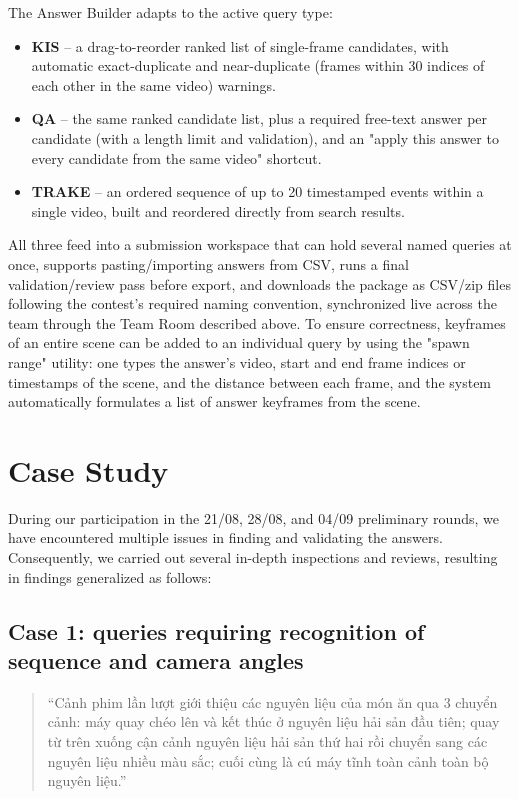 \documentclass[11pt,a4paper]{article}
\begin{document}
The Answer Builder adapts to the active query type:
\begin{itemize}[leftmargin=1.5em]
    \item \textbf{KIS} -- a drag-to-reorder ranked list of single-frame candidates, with automatic exact-duplicate and near-duplicate (frames within 30 indices of each other in the same video) warnings.
    \item \textbf{QA} -- the same ranked candidate list, plus a required free-text answer per candidate (with a length limit and validation), and an "apply this answer to every candidate from the same video" shortcut.
    \item \textbf{TRAKE} -- an ordered sequence of up to 20 timestamped events within a single video, built and reordered directly from search results.
\end{itemize}
All three feed into a submission workspace that can hold several named queries at once, supports pasting/importing answers from CSV, runs a final validation/review pass before export, and downloads the package as CSV/zip files following the contest's required naming convention, synchronized live across the team through the Team Room described above. To ensure correctness, keyframes of an entire scene can be added to an individual query by using the "spawn range" utility: one types the answer's video, start and end frame indices or timestamps of the scene, and the distance between each frame, and the system automatically formulates a list of answer keyframes from the scene.

\section{Case Study}

During our participation in the 21/08, 28/08, and 04/09 preliminary rounds, we have encountered multiple issues in finding and validating the answers. Consequently, we carried out several in-depth inspections and reviews, resulting in findings generalized as follows:

\subsection{Case 1: queries requiring recognition of sequence and camera angles}

\begin{quote}
    ``Cảnh phim lần lượt giới thiệu các nguyên liệu của món ăn qua 3 chuyển cảnh: máy quay chéo lên và kết thúc ở nguyên liệu hải sản đầu tiên; quay từ trên xuống cận cảnh nguyên liệu hải sản thứ hai rồi chuyển sang các nguyên liệu nhiều màu sắc; cuối cùng là cú máy tĩnh toàn cảnh toàn bộ nguyên liệu.''
\end{quote}
\end{document}
